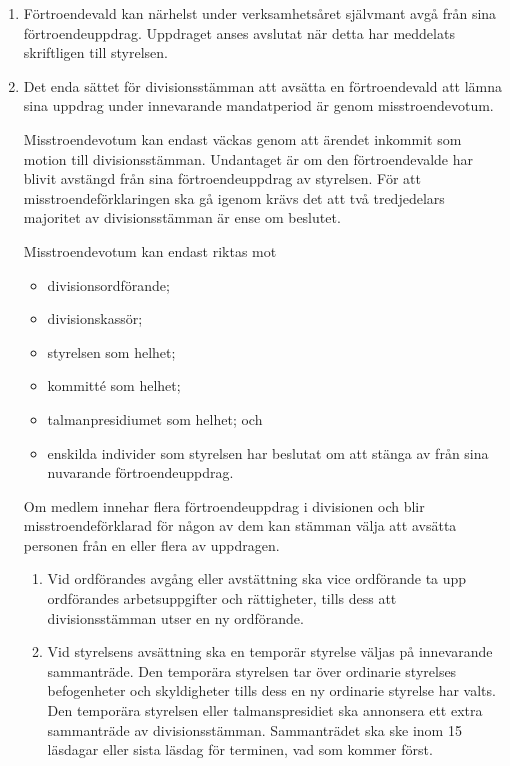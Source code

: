 \documentclass{dvd}
\begin{document}
	\begin{enumerate}[label=\arabic* §, ref=\arabic*]
		\item Förtroendevald kan närhelst under verksamhetsåret självmant avgå från sina förtroendeuppdrag.
		Uppdraget anses avslutat när detta har meddelats skriftligen till styrelsen.

		\item Det enda sättet för divisionsstämman att avsätta en förtroendevald att lämna sina uppdrag under innevarande mandatperiod är genom misstroendevotum.

		Misstroendevotum kan endast väckas genom att ärendet inkommit som motion till divisionsstämman.
		Undantaget är om den förtroendevalde har blivit avstängd från sina förtroendeuppdrag av styrelsen.
		För att misstroendeförklaringen ska gå igenom krävs det att två tredjedelars majoritet av divisionsstämman är ense om beslutet.

		Misstroendevotum kan endast riktas mot
		\begin{itemize}
			\item divisionsordförande;
			\item divisionskassör;
			\item styrelsen som helhet;
			\item kommitté som helhet;
			\item talmanpresidiumet som helhet; och
			\item enskilda individer som styrelsen har beslutat om att stänga av från sina nuvarande förtroendeuppdrag.
		\end{itemize}

		Om medlem innehar flera förtroendeuppdrag i divisionen och blir misstroendeförklarad för någon av dem kan stämman välja att avsätta personen från en eller flera av uppdragen.

		\begin{enumerate}[label=\theenumi~\alph* §, ref=\theenumi~\alph*]
			\item Vid ordförandes avgång eller avstättning ska vice ordförande ta upp ordförandes arbetsuppgifter och rättigheter, tills dess att divisionsstämman utser en ny ordförande.

			\item Vid styrelsens avsättning ska en temporär styrelse väljas på innevarande sammanträde.
			Den temporära styrelsen tar över ordinarie styrelses befogenheter och skyldigheter tills dess en ny ordinarie styrelse har valts.
			Den temporära styrelsen eller talmanspresidiet ska annonsera ett extra sammanträde av divisionsstämman.
			Sammanträdet ska ske inom 15 läsdagar eller sista läsdag för terminen, vad som kommer först.
		\end{enumerate}


\end{enumerate}
\end{document}
